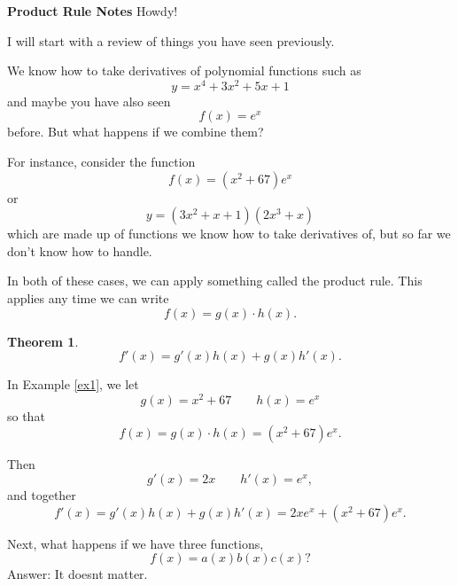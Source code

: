 \documentclass[11pt, reqno]{article}
\theoremstyle{plain}
\newtheorem*{theorem}{Theorem}
\theoremstyle{definition}
\theoremstyle{remark}
\begin{document}
\topmargin=-40pt
\renewcommand{\headrulewidth}{1pt}
\renewcommand{\headsep}{20pt}
\thispagestyle{fancy}

{\Huge \bfseries \noindent Product Rule Notes}
\bigbreak
{\Huge Howdy!}

I will start with a review of things you have seen previously.

We know how to take derivatives of polynomial functions such as
\[
    y = x^4 + 3x^2 + 5x + 1
\]
and maybe you have also seen
\[
    f(x) = e^x
\]
before. But what happens if we combine them?

For instance, consider the function
\begin{equation}\label{ex1}
    f(x) = (x^2 + 67)e^x
\end{equation}
or
\begin{equation}\label{ex2}
    y = (3x^2 + x +1)(2x^3 + x)
\end{equation}
which are made up of functions we know how to take derivatives of, but
so far we don't know how to handle. 

In both of these cases, we can apply something called the product rule. 
This applies any time we can write 
\[
    f(x) = g(x)\cdot h(x).
\]

\begin{theorem}
    \[
        f'(x) = g'(x)h(x) + g(x)h'(x).
    \]
\end{theorem}

In Example \ref{ex1}, we let 
\[
    g(x) = x^2 + 67\qquad h(x) = e^x
\]
so that 
\[
    f(x) = g(x)\cdot h(x) = (x^2 + 67)e^x.
\]

Then 
\[
    g'(x) = 2x \qquad h'(x) = e^x,
\]
and together 
\[
    f'(x) = g'(x)h(x) + g(x)h'(x) = 2x e^x + (x^2 + 67)e^x.
\]

Next, what happens if we have three functions,
\[
    f(x) = a(x)b(x)c(x)?
\]
Answer: It doesnt matter.
\end{document}
